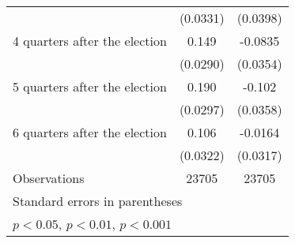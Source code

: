 \begin{table}[htbp]
\begin{tabular}{l*{2}{c}}
                    &    (0.0331)         &    (0.0398)         \\
[1em]
 4 quarters after the election&       0.149\sym{***}&     -0.0835\sym{*}  \\
                    &    (0.0290)         &    (0.0354)         \\
[1em]
 5 quarters after the election&       0.190\sym{***}&      -0.102\sym{**} \\
                    &    (0.0297)         &    (0.0358)         \\
[1em]
 6 quarters after the election&       0.106\sym{**} &     -0.0164         \\
                    &    (0.0322)         &    (0.0317)         \\
\hline
Observations        &       23705         &       23705         \\
\hline\hline
\multicolumn{3}{l}{\footnotesize Standard errors in parentheses}\\
\multicolumn{3}{l}{\footnotesize \sym{*} \(p<0.05\), \sym{**} \(p<0.01\), \sym{***} \(p<0.001\)}\\
\end{tabular}
\end{table}
